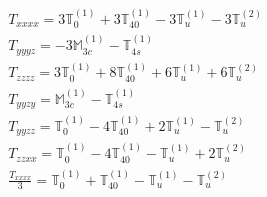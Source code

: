 \documentclass[fleqn,8pt,landscape]{jsarticle}
\begin{document}
\begin{align*}
& T_{xxxx} = 3 \mathbb{T}_{0}^{(1)} + 3 \mathbb{T}_{40}^{(1)} - 3 \mathbb{T}_{u}^{(1)} - 3 \mathbb{T}_{u}^{(2)} \\
& T_{yyyz} = - 3 \mathbb{M}_{3c}^{(1)} - \mathbb{T}_{4s}^{(1)} \\
& T_{zzzz} = 3 \mathbb{T}_{0}^{(1)} + 8 \mathbb{T}_{40}^{(1)} + 6 \mathbb{T}_{u}^{(1)} + 6 \mathbb{T}_{u}^{(2)} \\
& T_{yyzy} = \mathbb{M}_{3c}^{(1)} - \mathbb{T}_{4s}^{(1)} \\
& T_{yyzz} = \mathbb{T}_{0}^{(1)} - 4 \mathbb{T}_{40}^{(1)} + 2 \mathbb{T}_{u}^{(1)} - \mathbb{T}_{u}^{(2)} \\
& T_{zzxx} = \mathbb{T}_{0}^{(1)} - 4 \mathbb{T}_{40}^{(1)} - \mathbb{T}_{u}^{(1)} + 2 \mathbb{T}_{u}^{(2)} \\
& \frac{T_{xxxx}}{3} = \mathbb{T}_{0}^{(1)} + \mathbb{T}_{40}^{(1)} - \mathbb{T}_{u}^{(1)} - \mathbb{T}_{u}^{(2)}
\end{align*}
\end{document}
